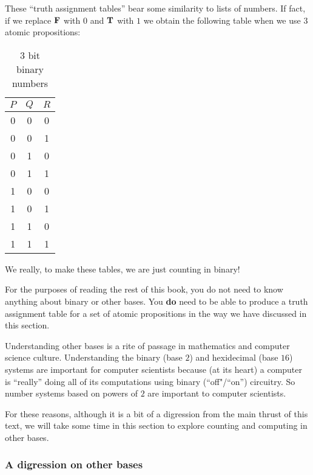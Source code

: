 These ``truth assignment tables'' bear some similarity to lists of numbers.  If fact, if we replace $\textbf{\textrm{F}}$ with $0$ and $\textbf{\textrm{T}}$ with $1$ we obtain the following table when we use $3$ atomic propositions:

		\begin{table}[h!]
	\begin{center}
		\caption{3 bit binary numbers}
		\begin{tabular}{c|c|c} 
			$P$ & $Q$ & $R$ \\
			\hline
			0& 0& 0  \\  \hline
			0& 0 & 1 \\  \hline
			0 & 1 & 0 \\  \hline
			0 & 1 & 1 \\  \hline
			1 & 0 & 0 \\  \hline
			1 & 0 &  1 \\  \hline
			1 & 1 &  0 \\  \hline
			1 & 1 &  1 \\  \hline
		\end{tabular}
	\end{center}
\end{table}

We really, to make these tables, we are just counting in binary!

For the purposes of reading the rest of this book, you do not need to know anything about binary or other bases.  You \textbf{do} need to be able to produce a truth assignment table for a set of atomic propositions in the way we have discussed in this section.

Understanding other bases is a rite of passage in mathematics and computer science culture.  Understanding the binary (base $2$)  and hexidecimal (base $16$) systems are important for computer scientists because (at its heart) a computer is ``really'' doing all of its computations using binary (``off"/``on'') circuitry.  So number systems based on powers of $2$ are important to computer scientists.

For these reasons, although it is a bit of a digression from the main thrust of this text, we will take some time in this section to explore counting and computing in other bases.

\subsubsection{A digression on other bases}


